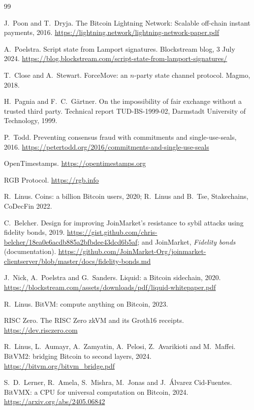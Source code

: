 \documentclass[11pt]{article}
\begin{document}
\begin{thebibliography}{99}

 J.~Poon and T.~Dryja. The Bitcoin Lightning Network: Scalable off-chain instant payments, 2016. \url{https://lightning.network/lightning-network-paper.pdf}

 A.~Poelstra. Script state from Lamport signatures. Blockstream blog, 3 July 2024. \url{https://blog.blockstream.com/script-state-from-lamport-signatures/}

 T.~Close and A.~Stewart. ForceMove: an $n$-party state channel protocol. Magmo, 2018.

 H.~Pagnia and F.~C.~G\"artner. On the impossibility of fair exchange without a trusted third party. Technical report TUD-BS-1999-02, Darmstadt University of Technology, 1999.

 P.~Todd. Preventing consensus fraud with commitments and single-use-seals, 2016. \url{https://petertodd.org/2016/commitments-and-single-use-seals}

 OpenTimestamps. \url{https://opentimestamps.org}

 RGB Protocol. \url{https://rgb.info}

 R.~Linus. Coins: a billion Bitcoin users, 2020; R.~Linus and B.~Tse, Stakechains, CoDecFin 2022.

 C.~Belcher. Design for improving JoinMarket's resistance to sybil attacks using fidelity bonds, 2019. \url{https://gist.github.com/chris-belcher/18ea0e6acdb885a2bfbdee43dcd6b5af}; and JoinMarket, \emph{Fidelity bonds} (documentation). \url{https://github.com/JoinMarket-Org/joinmarket-clientserver/blob/master/docs/fidelity-bonds.md}

 J.~Nick, A.~Poelstra and G.~Sanders. Liquid: a Bitcoin sidechain, 2020. \url{https://blockstream.com/assets/downloads/pdf/liquid-whitepaper.pdf}

 R.~Linus. BitVM: compute anything on Bitcoin, 2023.

 RISC Zero. The RISC Zero zkVM and its Groth16 receipts. \url{https://dev.risczero.com}

 R.~Linus, L.~Aumayr, A.~Zamyatin, A.~Pelosi, Z.~Avarikioti and M.~Maffei. BitVM2: bridging Bitcoin to second layers, 2024. \url{https://bitvm.org/bitvm_bridge.pdf}

 S.~D.~Lerner, R.~Amela, S.~Mishra, M.~Jonas and J.~\'Alvarez Cid-Fuentes. BitVMX: a CPU for universal computation on Bitcoin, 2024. \url{https://arxiv.org/abs/2405.06842}


\end{thebibliography}
\end{document}
